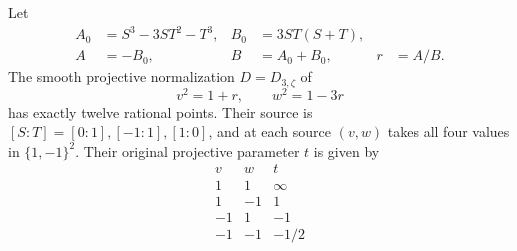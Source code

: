\begin{theorem}
\label{cb-twelve-points}
Let
\begin{align}
 A_0&=S^3-3ST^2-T^3,&B_0&=3ST(S+T),\\
 A&=-B_0,&B&=A_0+B_0,&r&=A/B.
 \label{cb-forms}
\end{align}
The smooth projective normalization \(D=D_{3,\zeta}\) of
\begin{equation}
 v^2=1+r,\qquad w^2=1-3r
 \label{cb-biquadratic}
\end{equation}
has exactly twelve rational points. Their source is
\([S:T]=[0:1],[-1:1],[1:0]\), and at each source
\((v,w)\) takes all four values in \(\{1,-1\}^2\).
Their original projective parameter \(t\) is given by
\begin{equation}
\begin{array}{cc|c}
 v&w&t\\\hline
 1&1&\infty\\1&-1&1\\-1&1&-1\\-1&-1&-1/2
\end{array}
 \label{cb-boundary-table}
\end{equation}
\end{theorem}
